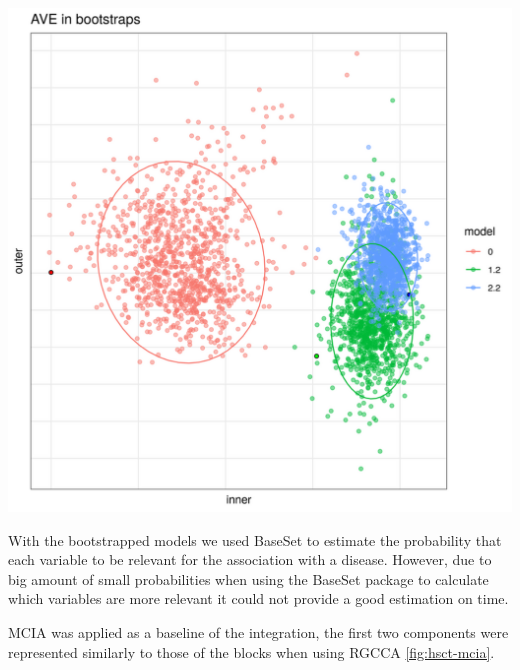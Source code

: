 \documentclass[
  a4paper,
]{book}
\let\origfigure\figure
\let\endorigfigure\endfigure
\renewenvironment{figure}[1][2] {
    \expandafter\origfigure\expandafter[!ht]
} {
    \endorigfigure
}
\begin{document}
\begin{figure}
\centering
\includegraphics{images/hsct-bootstrap.png}
\caption{\label{fig:hsct-bootstrap} Bootstrap of the models 0, 1.2 and 2.2. The point with the black circle is the AVE of the original data. The dispersion is shown by the ellipses. Model 0 and 1.2 have lower inner and outer AVE score, model 2.2 has lower outer score but higher inner value than the bootstrapped.}
\end{figure}

With the bootstrapped models we used BaseSet to estimate the probability that each variable to be relevant for the association with a disease.
However, due to big amount of small probabilities when using the BaseSet package to calculate which variables are more relevant it could not provide a good estimation on time.

MCIA was applied as a baseline of the integration, the first two components were represented similarly to those of the blocks when using RGCCA \ref{fig:hsct-mcia}.
\end{document}
